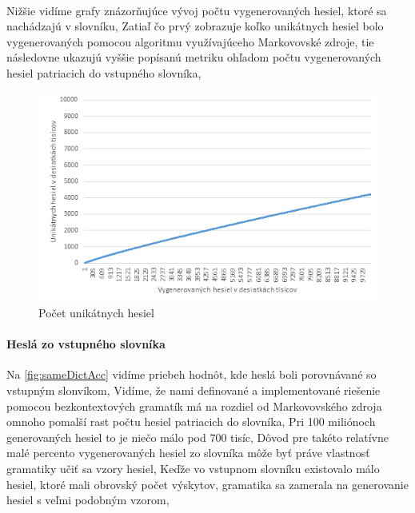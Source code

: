 \paragraph{}
Nižšie vidíme grafy znázorňujúce vývoj počtu vygenerovaných hesiel, ktoré sa nachádzajú v slovníku, Zatiaľ čo prvý zobrazuje koľko unikátnych hesiel bolo vygenerovaných pomocou algoritmu využívajúceho Markovovské zdroje, tie následovne ukazujú vyššie popísanú metriku ohľadom počtu vygenerovaných hesiel patriacich do vstupného slovníka,

\begin{figure}[ht]
    \centering
    \includegraphics[width=1\textwidth]{uniqMarkov}
    \caption{Počet unikátnych hesiel}
    \label{fig:uniqMarkov}
\end{figure}
\paragraph{Heslá zo vstupného slovníka}
Na \ref{fig:sameDictAcc} vidíme priebeh hodnôt, kde heslá boli porovnávané so vstupným slonvíkom, Vidíme, že nami definované a implementované riešenie pomocou bezkontextových gramatík má na rozdiel od Markovovského zdroja omnoho pomalší rast počtu hesiel patriacich do slovníka, Pri 100 miliónoch generovaných hesiel to je niečo málo pod 700 tisíc, Dôvod pre takéto relatívne malé percento vygenerovaných hesiel zo slovníka môže byť práve vlastnosť gramatiky učiť sa vzory hesiel, Keďže vo vstupnom slovníku existovalo málo hesiel, ktoré mali obrovský počet výskytov, gramatika sa zamerala na generovanie hesiel s veľmi podobným vzorom,

